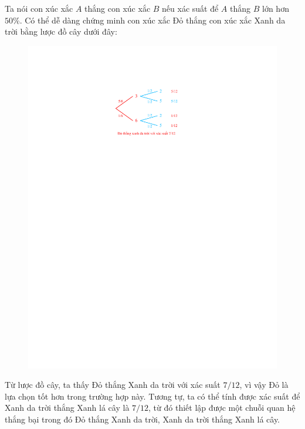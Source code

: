 \begin{multicols}{2}
\begin{figure}[H]
		\vspace*{-15pt}
	\end{figure}
	Ta nói con xúc xắc $A$ thắng con xúc xắc $B$ nếu xác suất để $A$ thắng $B$ lớn hơn $50\%$. Có thể dễ dàng chứng minh con xúc xắc Đỏ thắng con xúc xắc Xanh da trời bằng lược đồ cây dưới đây:
	\begin{figure}[H]
		\vspace*{-15pt}
		\centering
		\captionsetup{labelformat= empty, justification=centering}
		\includegraphics[scale =1]{2}
		\vspace*{-15pt}
	\end{figure}
	Từ lược đồ cây, ta thấy Đỏ thắng Xanh da trời với xác suất $7/12$, vì vậy Đỏ là lựa chọn tốt hơn trong trường hợp này.
	\vskip 0.05cm
	Tương tự, ta có thể tính được xác suất để Xanh da trời thắng Xanh lá cây là $7/12$, từ đó thiết lập được một chuỗi quan hệ thắng bại trong đó Đỏ thắng Xanh da trời, Xanh da trời thắng Xanh lá cây.
	\begin{figure}[H]

\end{figure}
\end{multicols}
